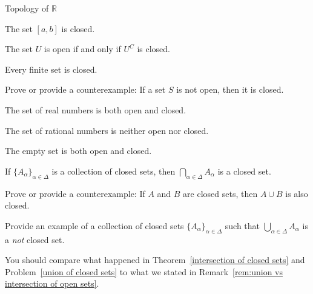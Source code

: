 \begin{section}{Topology of $\mathbb{R}$}
\begin{problem}
\end{problem}

\begin{theorem}
The set $[a,b]$ is closed.
\end{theorem}

\begin{theorem}
The set $U$ is open if and only if $U^C$ is closed.
\end{theorem}

\begin{theorem}
Every finite set is closed.
\end{theorem}

\begin{problem}
Prove or provide a counterexample: If a set $S$ is not open, then it is closed.
\end{problem}

\begin{theorem}
The set of real numbers is both open and closed.
\end{theorem}

\begin{theorem}
The set of rational numbers is neither open nor closed.
\end{theorem}

\begin{theorem}
The empty set is both open and closed.
\end{theorem}

\begin{theorem}\label{intersection of closed sets}
If $\{A_{\alpha}\}_{\alpha\in\Delta}$ is a collection of closed sets, then $\bigcap_{\alpha\in \Delta} A_{\alpha}$ is a closed set.
\end{theorem}

\begin{problem}
Prove or provide a counterexample: If $A$ and $B$ are closed sets, then $A\cup B$ is also closed.
\end{problem}

\begin{problem}\label{union of closed sets}
Provide an example of a collection of closed sets $\{A_{\alpha}\}_{\alpha\in\Delta}$ such that $\bigcup_{\alpha\in \Delta} A_{\alpha}$ is a \emph{not} closed set.
\end{problem}

\begin{remark}
You should compare what happened in Theorem~\ref{intersection of closed sets} and Problem~\ref{union of closed sets} to what we stated in Remark~\ref{rem:union vs intersection of open sets}.
\end{remark}

\end{section}